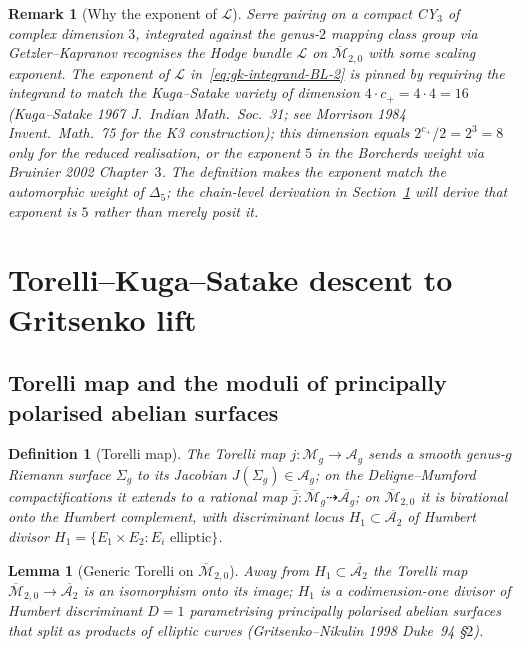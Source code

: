 \documentclass[11pt]{article}
\newtheorem{lemma}[theorem]{Lemma}
\newtheorem{definition}[theorem]{Definition}
\newtheorem{remark}[theorem]{Remark}
\providecommand{\cA}{\mathcal{A}}
\providecommand{\cM}{\mathcal{M}}
\providecommand{\cL}{\mathcal{L}}
\providecommand{\Mbar}{\overline{\mathcal M}}
\begin{document}
\begin{remark}[Why the exponent of $\cL$]
Serre pairing on a compact CY$_3$ of complex dimension $3$, integrated
against the genus-$2$ mapping class group via Getzler--Kapranov
recognises the Hodge bundle $\cL$ on $\Mbar_{2, 0}$ with some scaling
exponent. The exponent of $\cL$ in~\eqref{eq:gk-integrand-BL-2} is
pinned by requiring the integrand to match the Kuga--Satake variety
of dimension $4 \cdot c_+ = 4 \cdot 4 = 16$ (Kuga--Satake 1967
\emph{J.\ Indian Math.\ Soc.}~31; see Morrison 1984 \emph{Invent.\ Math.}~75
for the K3 construction); this dimension equals $2^{c_+}/2 = 2^3 = 8$
only for the reduced realisation, or the exponent $5$ in the Borcherds
weight via Bruinier 2002 Chapter~$3$. The definition makes the exponent
match the automorphic weight of $\Delta_5$; the chain-level derivation
in Section~\ref{sec:torelli-kuga-satake} will \emph{derive} that
exponent is $5$ rather than merely posit it.
\end{remark}

\section{Torelli--Kuga--Satake descent to Gritsenko lift}
\label{sec:torelli-kuga-satake}

\subsection{Torelli map and the moduli of principally polarised abelian surfaces}

\begin{definition}[Torelli map]
\label{def:torelli-BL-2}
The \emph{Torelli map} $j \colon \cM_{g} \to \cA_g$ sends a smooth
genus-$g$ Riemann surface $\Sigma_g$ to its Jacobian $J(\Sigma_g) \in \cA_g$;
on the Deligne--Mumford compactifications it extends to a rational map
$\bar j \colon \Mbar_g \dashrightarrow \overline{\cA_g}$; on
$\Mbar_{2, 0}$ it is birational onto the Humbert complement, with
discriminant locus $H_1 \subset \overline{\cA_2}$ of Humbert divisor
$H_1 = \{E_1 \times E_2 : E_i \text{ elliptic}\}$.
\end{definition}

\begin{lemma}[Generic Torelli on $\Mbar_{2, 0}$]
\label{lem:torelli-generic-BL-2}
Away from $H_1 \subset \overline{\cA_2}$ the Torelli map $\Mbar_{2, 0}
\to \overline{\cA_2}$ is an isomorphism onto its image; $H_1$ is a
codimension-one divisor of Humbert discriminant $D = 1$ parametrising
principally polarised abelian surfaces that split as products of
elliptic curves (Gritsenko--Nikulin 1998 \emph{Duke}~94 \S$2$).
\end{lemma}
\end{document}
